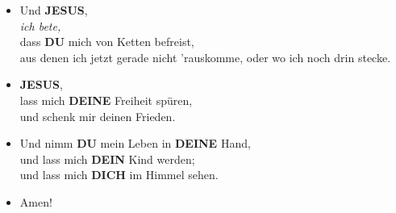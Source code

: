 \documentclass[10pt,a5paper]{article}
\newcommand{\Deine}[0]{\textbf{DEINE}}
\newcommand{\Dein}[0]{\textbf{DEIN}}
\newcommand{\Dich}[0]{\textbf{DICH}}
\newcommand{\Dir}[0]{\textbf{DIR}}
\newcommand{\Du}[0]{\textbf{DU}}
\newcommand{\Jesus}[0]{\textbf{JESUS}}
\begin{document}
\begin{itemize}[nosep]
			\\		dass {\Du} mein Leben wieder in Ordnung bringst,
			\\		und mir wieder Lebensfreude gibst,
			\\		und Freude die von {\Dir} kommt,
			\\		lebendiges Wasser in mir,
			\\		das von {\Dir} kommt.
			\item	Und {\Jesus},
			\\		\textit{ich bete,}
			\\		dass {\Du} mich von Ketten befreist,
			\\		aus denen ich jetzt gerade nicht 'rauskomme,
					oder wo ich noch drin stecke.
			\item	{\Jesus},
			\\		lass mich {\Deine} Freiheit spüren,
			\\		und schenk mir deinen Frieden.
			\item	Und nimm {\Du} mein Leben in {\Deine} Hand,
			\\		und lass mich {\Dein} Kind werden;
			\\		und lass mich {\Dich} im Himmel sehen.
			\item	Amen!
		\end{itemize}
\end{document}
